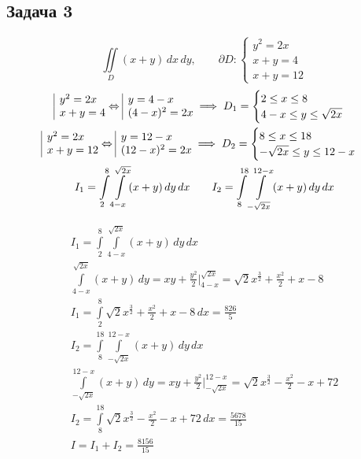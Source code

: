 \documentclass[a4paper,fleqn,12pt]{article}
\theoremstyle{definition}
\begin{document}
\subsection*{Задача 3}
$$\iint\limits_D (x+y) \, dx \, dy, \qquad \partial D: \begin{cases} y^2 = 2x \\ x+y = 4 \\ x+y = 12 \end{cases}$$
\begin{gather*}
\begin{array}{|l@{}}
y^2 = 2x \\
x+y = 4
\end{array} \Leftrightarrow
\begin{array}{|l@{}}
y = 4 - x \\
(4-x)^2 = 2x
\end{array} \implies D_1 =  \begin{cases} 2 \leq x \leq 8 \\ 4-x \leq y \leq \sqrt{2x} \end{cases} \\
\begin{array}{|l@{}}
y^2 = 2x \\
x+y = 12
\end{array} \Leftrightarrow
\begin{array}{|l@{}}
y = 12 - x \\
(12-x)^2 = 2x
\end{array} \implies D_2 =  \begin{cases} 8 \leq x \leq 18 \\ -\sqrt{2x} \leq y \leq 12-x \end{cases} \\
I_1 = \int\limits_2 ^8 \int\limits_{4-x} ^{\sqrt{2x}} (x+y)\, dy \,dx  \qquad I_2 = \int\limits_8 ^{18} \int\limits_{-\sqrt{2x}} ^{12-x} (x+y)\, dy \,dx
\end{gather*}

\begin{gather*}
I_1 = \int\limits_2 ^8 \int\limits_{4-x} ^{\sqrt{2x}} (x+y)\, dy \,dx   \\
\int\limits_{4-x} ^{\sqrt{2x}} (x+y)\, dy  = xy + \frac{y^2}{2} \Big|_{4-x} ^{\sqrt{2x}} = \sqrt{2} x^{\frac{3}{2}} + \frac{x^2}{2} + x - 8 \\
I_1 = \int\limits_2 ^8  \sqrt{2} x^{\frac{3}{2}} + \frac{x^2}{2} + x - 8 \, dx  = \frac{826}{5} \\
I_2 = \int\limits_8 ^{18} \int\limits_{-\sqrt{2x}} ^{12-x} (x+y)\, dy \,dx \\
\int\limits_{-\sqrt{2x}} ^{12-x} (x+y)\, dy  = xy + \frac{y^2}{2} \Big|_{-\sqrt{2x}} ^{12-x} = \sqrt{2} x^{\frac{3}{2}} - \frac{x^2}{2} - x + 72 \\
I_2 = \int\limits_8 ^{18} \sqrt{2} x^{\frac{3}{2}} - \frac{x^2}{2} - x + 72 \,dx = \frac{5678}{15}\\
I = I_1 + I_2 = \frac{8156}{15}
\end{gather*}
\end{document}
